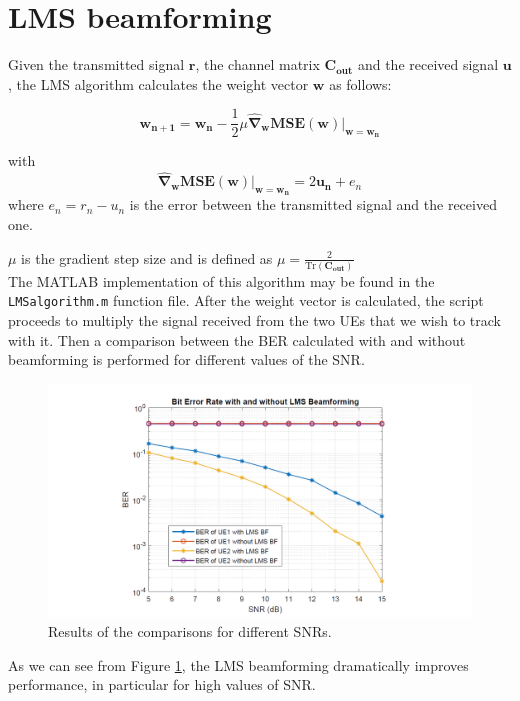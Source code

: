 \documentclass[a4paper,10pt]{article}
\begin{document}
\section{LMS beamforming}
Given the transmitted signal $\mathbf{r}$, the channel matrix $\mathbf{C_{out}}$ and the received signal $\mathbf{u}$, the LMS algorithm calculates the weight vector $\mathbf{w}$ as follows:

$$ \mathbf{w_{n+1}} = \mathbf{w_{n}}-\frac{1}{2}\mu \mathbf{\widehat{\nabla}_w MSE}(\mathbf{w})|_{\mathbf{w=w_n}} $$

with $$\mathbf{\widehat{\nabla}_w MSE}(\mathbf{w})|_{\mathbf{w=w_n}} = 2\mathbf{u_n}+e_n$$ 
where $e_n = r_n - u_n$ is the error between the transmitted signal and the received one.

\noindent $\mu$ is the gradient step size and is defined as $\displaystyle \mu = \frac{2}{\mathrm{Tr}(\mathbf{C_{out}})}$ \\

The MATLAB implementation of this algorithm may be found in the \texttt{LMSalgorithm.m} function file. After the weight vector is calculated, the script proceeds to multiply the signal received from the two UEs that we wish to track with it. Then a comparison between the BER calculated with and without beamforming is performed for different values of the SNR.

\begin{figure}[H]
	\centering
	\includegraphics[width=\linewidth]{bersnr.png}
	\caption{\label{fig:bersnr}Results of the comparisons for different SNRs.}
\end{figure}
As we can see from Figure \ref{fig:bersnr}, the LMS beamforming dramatically improves performance, in particular for high values of SNR.
\end{document}
